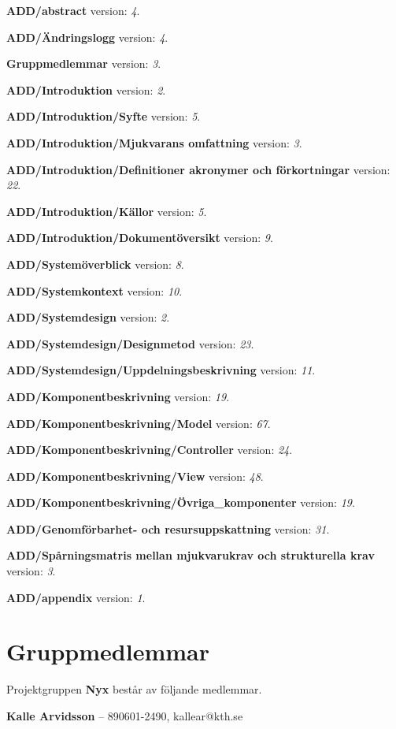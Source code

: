 \documentclass[a4paper, twoside, 11pt, titlepage]{article}
\begin{document}
\textbf{ADD/abstract} version: \emph{4}.

\textbf{ADD/Ändringslogg} version: \emph{4}.

\textbf{Gruppmedlemmar} version: \emph{3}.

\textbf{ADD/Introduktion} version: \emph{2}.

\textbf{ADD/Introduktion/Syfte} version: \emph{5}.

\textbf{ADD/Introduktion/Mjukvarans omfattning} version: \emph{3}.

\textbf{ADD/Introduktion/Definitioner akronymer och förkortningar} version: \emph{22}.

\textbf{ADD/Introduktion/Källor} version: \emph{5}.

\textbf{ADD/Introduktion/Dokumentöversikt} version: \emph{9}.

\textbf{ADD/Systemöverblick} version: \emph{8}.

\textbf{ADD/Systemkontext} version: \emph{10}.

\textbf{ADD/Systemdesign} version: \emph{2}.

\textbf{ADD/Systemdesign/Designmetod} version: \emph{23}.

\textbf{ADD/Systemdesign/Uppdelningsbeskrivning} version: \emph{11}.

\textbf{ADD/Komponentbeskrivning} version: \emph{19}.

\textbf{ADD/Komponentbeskrivning/Model} version: \emph{67}.

\textbf{ADD/Komponentbeskrivning/Controller} version: \emph{24}.

\textbf{ADD/Komponentbeskrivning/View} version: \emph{48}.

\textbf{ADD/Komponentbeskrivning/Övriga\_komponenter} version: \emph{19}.

\textbf{ADD/Genomförbarhet- och resursuppskattning} version: \emph{31}.

\textbf{ADD/Spårningsmatris mellan mjukvarukrav och strukturella krav} version: \emph{3}.

\textbf{ADD/appendix} version: \emph{1}.

\clearpage
\section*{Gruppmedlemmar}


Projektgruppen \textbf{Nyx} består av följande medlemmar.

\textbf{Kalle Arvidsson} -- 890601-2490, kallear@kth.se
\end{document}
